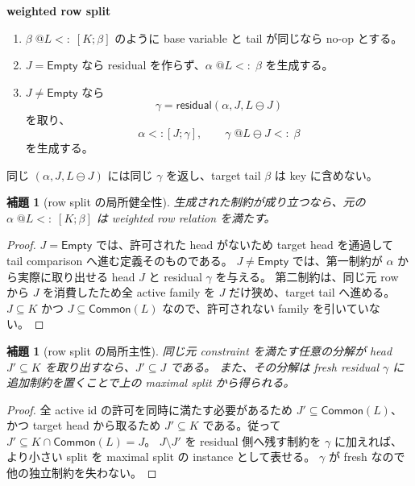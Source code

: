 \documentclass[uplatex,dvipdfmx,a4paper,10.5pt]{jsarticle}
\makeatletter
\theoremstyle{jpplain}
\newtheorem{lemma}[definition]{補題}
\newcommand{\Empty}{\mathsf{Empty}}
\newcommand{\resid}{\mathsf{residual}}
\newcommand{\Common}{\mathsf{Common}}
\newcommand{\row}[2]{[#1;#2]}
\newcommand{\lsub}[3]{#1\;@#2\mathrel{<:}\;#3}
\newcommand{\subty}[2]{#1\mathrel{<:}#2}
\makeatother
\begin{document}
\begin{formalbox}
\textbf{weighted row split}

\begin{enumerate}
  \item $\lsub{\beta}{L}{\row{K}{\beta}}$ のように base variable と tail が同じなら no-op とする。
  \item $J=\Empty$ なら residual を作らず、$\lsub{\alpha}{L}{\beta}$ を生成する。
  \item $J\neq\Empty$ なら
  \[
    \gamma=\resid(\alpha,J,L\ominus J)
  \]
  を取り、
  \[
    \subty{\alpha}{\row{J}{\gamma}},
    \qquad
    \lsub{\gamma}{L\ominus J}{\beta}
  \]
  を生成する。
\end{enumerate}
同じ $(\alpha,J,L\ominus J)$ には同じ $\gamma$ を返し、target tail $\beta$ は key に含めない。
\end{formalbox}

\begin{lemma}[row split の局所健全性]
生成された制約が成り立つなら、元の
$\lsub{\alpha}{L}{\row{K}{\beta}}$ は weighted row relation を満たす。
\end{lemma}

\begin{proof}
$J=\Empty$ では、許可された head がないため target head を通過して tail comparison へ進む定義そのものである。
$J\neq\Empty$ では、第一制約が $\alpha$ から実際に取り出せる head $J$ と residual $\gamma$ を与える。
第二制約は、同じ元 row から $J$ を消費したため全 active family を $J$ だけ狭め、target tail へ進める。
$J\subseteq K$ かつ $J\subseteq\Common(L)$ なので、許可されない family を引いていない。
\end{proof}

\begin{lemma}[row split の局所主性]
同じ元 constraint を満たす任意の分解が head $J'\subseteq K$ を取り出すなら、$J'\subseteq J$ である。
また、その分解は fresh residual $\gamma$ に追加制約を置くことで上の maximal split から得られる。
\end{lemma}

\begin{proof}
全 active id の許可を同時に満たす必要があるため $J'\subseteq\Common(L)$、かつ target head から取るため
$J'\subseteq K$ である。従って $J'\subseteq K\cap\Common(L)=J$。
$J\setminus J'$ を residual 側へ残す制約を $\gamma$ に加えれば、より小さい split を maximal split の instance として表せる。
$\gamma$ が fresh なので他の独立制約を失わない。
\end{proof}
\end{document}
